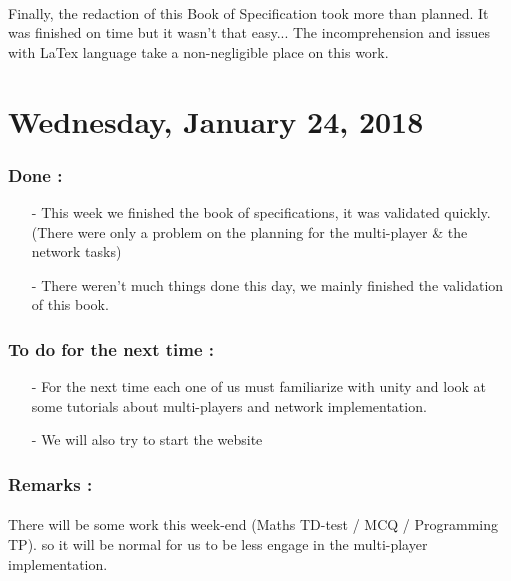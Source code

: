 \documentclass[12pt]{article}
\begin{document}
		\paragraph{} Finally, the redaction of this Book of Specification took more than planned. It was finished on time but it wasn't that easy... The incomprehension and issues with LaTex language take a non-negligible place on this work.
\newpage

\section*{Wednesday, January 24, 2018}
	\subsubsection*{Done :}
      \begin{itemize}
        \item[-] This week we finished the book of specifications, it was validated quickly. (There were only a problem on the planning for the multi-player \& the network tasks)
        \item[-] There weren't much things done this day, we mainly finished the validation of this book.
      \end{itemize}
    
    \subsubsection*{To do for the next time :}
      \begin{itemize}
        \item[-] For the next time each one of us must familiarize with unity and look at some tutorials about multi-players and network implementation.
        \item[-] We will also try to start the website
      \end{itemize}
    
	\subsubsection*{Remarks :}
		\paragraph{} There will be some work this week-end (Maths TD-test / MCQ / Programming TP). so it will be normal for us to be less engage in the multi-player implementation.
\newpage
\end{document}
